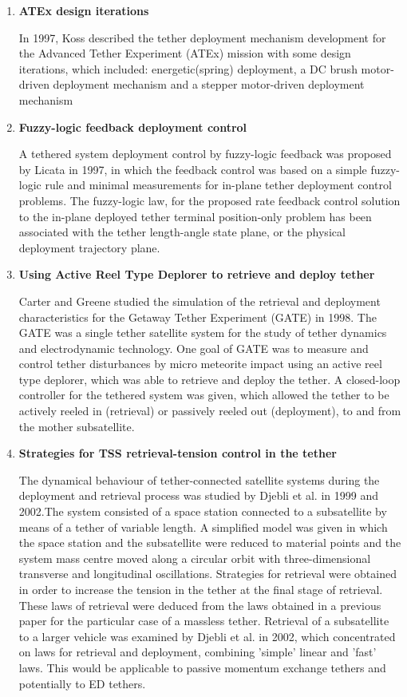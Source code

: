 \begin{enumerate}

\item \textbf{ATEx design iterations}

In 1997, Koss described the tether deployment mechanism development for the Advanced Tether Experiment (ATEx) mission with some design iterations, which included: energetic(spring) deployment, a DC brush motor-driven deployment mechanism and a stepper motor-driven deployment mechanism

\item \textbf{Fuzzy-logic feedback deployment control}

A tethered system deployment control by fuzzy-logic feedback was proposed by Licata in 1997, in which the feedback control was based on a simple fuzzy-logic rule and minimal measurements for in-plane tether deployment control problems. The fuzzy-logic law, for the proposed rate feedback control solution to the in-plane deployed tether terminal position-only problem has been associated with the tether length-angle state plane, or the physical deployment trajectory plane.

\item \textbf{Using Active Reel Type Deplorer to retrieve and deploy tether}

Carter and Greene studied the simulation of the retrieval and deployment characteristics for the Getaway Tether Experiment (GATE) in 1998. The GATE was a single tether satellite system for the study of tether dynamics and electrodynamic technology. One goal of GATE was to measure and control tether disturbances by micro meteorite impact using an active reel type deplorer, which was able to retrieve and deploy the tether. A closed-loop controller for the tethered system was given, which allowed the tether to be actively reeled in (retrieval) or passively reeled out (deployment), to and from the mother subsatellite.

\item \textbf{Strategies for TSS retrieval-tension control in the tether}

The dynamical behaviour of tether-connected satellite systems during the deployment and retrieval process was studied by Djebli et al. in 1999 and 2002.The system consisted of a space station connected to a subsatellite by means of a tether of variable length. A simplified model was given in which the space station and the subsatellite were reduced to material points and the system mass centre moved along a circular orbit with three-dimensional transverse and longitudinal oscillations. Strategies for retrieval were obtained in order to increase the tension in the tether at the final stage of retrieval. These laws of retrieval were deduced from the laws obtained in a previous paper for the particular case of a massless tether. Retrieval of a subsatellite to a larger vehicle was examined by Djebli et al. in 2002, which concentrated on laws for retrieval and deployment, combining 'simple' linear and 'fast' laws. This would be applicable to passive momentum exchange tethers and potentially to ED tethers.



\end{enumerate}

